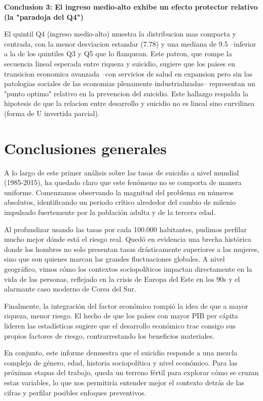 \documentclass[12pt, letterpaper]{article}
\begin{document}
\textbf{Conclusion 3: El ingreso medio-alto exhibe un efecto protector relativo (la "paradoja del Q4")}


El quintil Q4 (ingreso medio-alto) muestra la distribucion mas compacta y centrada, con la menor desviacion estandar (7.78) y una mediana de 9.5 --inferior a la de los quintiles Q3 y Q5 que lo flanquean. Este patron, que rompe la secuencia lineal esperada entre riqueza y suicidio, sugiere que los paises en transicion economica avanzada --con servicios de salud en expansion pero sin las patologias sociales de las economias plenamente industrializadas-- representan un "punto optimo" relativo en la prevencion del suicidio. Este hallazgo respalda la hipotesis de que la relacion entre desarrollo y suicidio no es lineal sino curvilinea (forma de U invertida parcial).

\section{Conclusiones generales}

A lo largo de este primer análisis sobre las tasas de suicidio a nivel mundial (1985-2015), ha quedado claro que este fenómeno no se comporta de manera uniforme. Comenzamos observando la magnitud del problema en números absolutos, identificando un periodo crítico alrededor del cambio de milenio impulsado fuertemente por la población adulta y de la tercera edad.

Al profundizar usando las tasas por cada 100.000 habitantes, pudimos perfilar mucho mejor dónde está el riesgo real. Quedó en evidencia una brecha histórica donde los hombres no solo presentan tasas drásticamente superiores a las mujeres, sino que son quienes marcan las grandes fluctuaciones globales. A nivel geográfico, vimos cómo los contextos sociopolíticos impactan directamente en la vida de las personas, reflejado en la crisis de Europa del Este en los 90s y el alarmante caso moderno de Corea del Sur.

Finalmente, la integración del factor económico rompió la idea de que a mayor riqueza, menor riesgo. El hecho de que los países con mayor PIB per cápita lideren las estadísticas sugiere que el desarrollo económico trae consigo sus propios factores de riesgo, contrarrestando los beneficios materiales.

En conjunto, este informe demuestra que el suicidio responde a una mezcla compleja de género, edad, historia sociopolítica y nivel económico. Para las próximas etapas del trabajo, queda un terreno fértil para explorar cómo se cruzan estas variables, lo que nos permitiría entender mejor el contexto detrás de las cifras y perfilar posibles enfoques preventivos.
\end{document}
